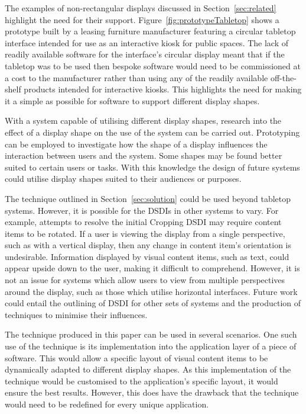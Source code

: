 \documentclass[review,5p,times,twocolumn]{elsarticle}
\begin{document}
The examples of non-rectangular displays discussed in Section~\ref{sec:related} highlight the need for their support.
Figure~\ref{fig:prototypeTabletop} shows a prototype built by a leasing furniture manufacturer featuring a circular tabletop interface intended for use as an interactive kiosk for public spaces.
The lack of readily available software for the interface's circular display meant that if the tabletop was to be used then bespoke software would need to be commissioned at a cost to the manufacturer rather than using any of the readily available off-the-shelf products intended for interactive kiosks.
This highlights the need for making it a simple as possible for software to support different display shapes.


With a system capable of utilising different display shapes, research into the effect of a display shape on the use of the system can be carried out.
Prototyping can be employed to investigate how the shape of a display influences the interaction between users and the system.
Some shapes may be found better suited to certain users or tasks.
With this knowledge the design of future systems could utilise display shapes suited to their audiences or purposes.

The technique outlined in Section~\ref{sec:solution} could be used beyond tabletop systems.
However, it is possible for the \acp{DSDI} in other systems to vary. 
For example, attempts to resolve the initial Cropping \ac{DSDI} may require content items to be rotated.
If a user is viewing the display from a single perspective, such as with a vertical display, then any change in content item's orientation is undesirable.
Information displayed by visual content items, such as text, could appear upside down to the user, making it difficult to comprehend.
However, it is not an issue for systems which allow users to view from multiple perspectives around the display, such as those which utilise horizontal interfaces.
Future work could entail the outlining of \ac{DSDI} for other sets of systems and the production of techniques to minimise their influences.

The technique produced in this paper can be used in several scenarios.
One such use of the technique is its implementation into the application layer of a piece of software.
This would allow a specific layout of visual content items to be dynamically adapted to different display shapes.
As this implementation of the technique would be customised to the application's specific layout, it would ensure the best results.
However, this does have the drawback that the technique would need to be redefined for every unique application.
\end{document}
